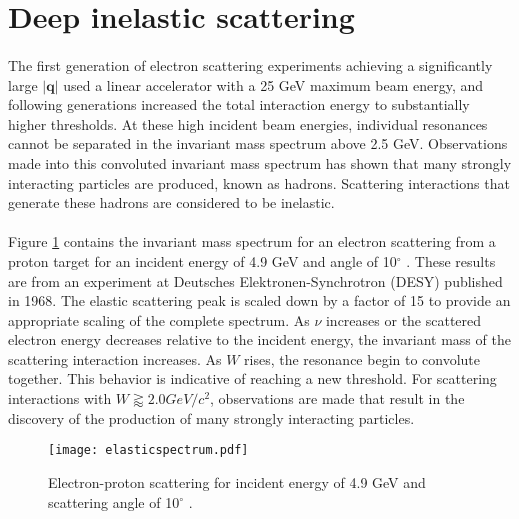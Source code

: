 \section{Deep inelastic scattering}\label{sec:DIS}
\paragraph{}The first generation of electron scattering experiments achieving a significantly large  $|\boldsymbol{q}|$ used a linear accelerator with a 25 GeV maximum beam energy, and following generations increased the total interaction energy to substantially higher thresholds. At these high incident beam energies, individual resonances cannot be separated in the invariant mass spectrum above 2.5 GeV. Observations made into this convoluted invariant mass spectrum has shown that many strongly interacting particles are produced, known as hadrons. Scattering interactions that generate these hadrons are considered to be inelastic.
\paragraph{} Figure \ref{wspect} contains the invariant mass spectrum for an electron scattering from a proton target for an incident energy of 4.9 GeV  and angle of 10$^\circ$ \cite{deltaIsobar}. These results are from an experiment at Deutsches Elektronen-Synchrotron (DESY) published in 1968. The elastic scattering peak is scaled down by a factor of 15 to provide an appropriate scaling of the complete spectrum. As $\nu$ increases or the scattered electron energy decreases relative to the incident energy, the invariant mass of the scattering interaction increases. As $W$ rises, the resonance begin to convolute together. This behavior is indicative of reaching a new threshold. For scattering interactions with $W \gtrapprox 2.0 GeV/c^2$, observations are made that result in the discovery of the production of many strongly interacting particles. 
\begin{figure}[]
	\centering
	\textbf{ }\par\medskip
	\texttt{[image: elasticspectrum.pdf]}
	\caption{Electron-proton scattering for incident energy of 4.9 GeV and scattering angle of 10$^\circ$ \cite{deltaIsobar}.}
	\label{wspect}
\end{figure}
